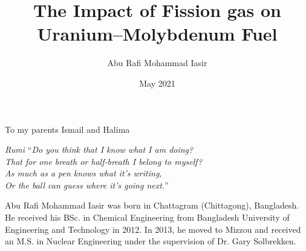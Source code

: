 \documentclass[hyper,dissertation]{MUthesis}
\title{The Impact of Fission gas on Uranium--Molybdenum Fuel}
\author{Abu Rafi Mohammad Iasir}
\date{May 2021}
\begin{document}
\frontmatter   %
\maketitle     %
\copyrightpage %
\approvalpage  %

\begin{dedication}
To my parents Ismail and Halima 
\end{dedication}

\begin{epigraph}{\textit{Rumi}}
``\textit{Do you think that I know what I am doing? \\
  That for one breath or half-breath I belong to myself?\\
  As much as a pen knows what it's writing,\\
  Or the ball can guess where it's going next.}''
\end{epigraph}


\begin{acknowledgments}

\end{acknowledgments}


\tableofcontents
\listoftables

\listoffigures
\listofsymbols %





\mainmatter %
















\appendix




%



\backmatter %



\begin{vita}
Abu Rafi Mohammad Iasir was born in Chattagram (Chittagong), Bangladesh. He received his BSc. in Chemical Engineering from Bangladesh University of Engineering and Technology in 2012. In 2013, he moved to Mizzou and received an M.S. in Nuclear Engineering under the supervision of Dr. Gary Solbrekken. 
\end{vita}
\end{document}
